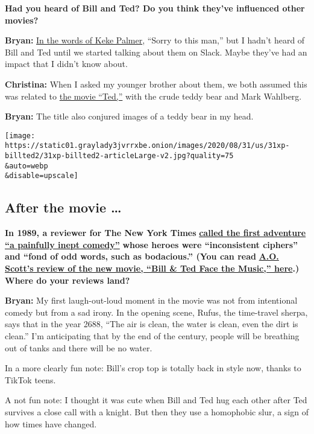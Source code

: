 \textbf{Had you heard of Bill and Ted? Do you think they've influenced
other movies?}

\textbf{Bryan:}
\href{https://www.wired.com/story/sorry-to-this-man-meme/}{In the words
of Keke Palmer}, ``Sorry to this man,'' but I hadn't heard of Bill and
Ted until we started talking about them on Slack. Maybe they've had an
impact that I didn't know about.

\textbf{Christina:} When I asked my younger brother about them, we both
assumed this was related to
\href{https://www.nytimes3xbfgragh.onion/2012/06/29/movies/ted-by-seth-macfarlane-with-mark-wahlberg-and-mila-kunis.html}{the
movie ``Ted,''} with the crude teddy bear and Mark Wahlberg.

\textbf{Bryan:} The title also conjured images of a teddy bear in my
head.

\texttt{[image: https://static01.graylady3jvrrxbe.onion/images/2020/08/31/us/31xp-billted2/31xp-billted2-articleLarge-v2.jpg?quality=75\\\&auto=webp\\\&disable=upscale]}

\hypertarget{after-the-movie--}{%
\subsection{After the movie \ldots{}~}\label{after-the-movie--}}

\textbf{In 1989, a reviewer for The New York Times}
\textbf{\href{https://www.nytimes3xbfgragh.onion/1989/02/17/movies/reviews-film-teen-agers-on-a-tour-of-history.html}{called
the first adventure ``a painfully inept comedy''}} \textbf{whose heroes
were ``inconsistent ciphers'' and ``fond of odd words, such as
bodacious.'' (You can read}
\textbf{\href{https://www.nytimes3xbfgragh.onion/2020/08/27/movies/bill-and-ted-face-the-music-review.html}{A.O.
Scott's review of the new movie, ``Bill \& Ted Face the Music,'' here}.)
Where do your reviews land?}

\textbf{Bryan:} My first laugh-out-loud moment in the movie was not from
intentional comedy but from a sad irony. In the opening scene, Rufus,
the time-travel sherpa, says that in the year 2688, ``The air is clean,
the water is clean, even the dirt is clean.'' I'm anticipating that by
the end of the century, people will be breathing out of tanks and there
will be no water.

In a more clearly fun note: Bill's crop top is totally back in style
now, thanks to TikTok teens.

A not fun note: I thought it was cute when Bill and Ted hug each other
after Ted survives a close call with a knight. But then they use a
homophobic slur, a sign of how times have changed.

